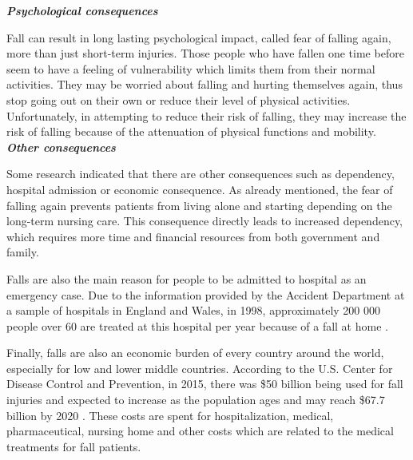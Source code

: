 \documentclass[letterpaper,12pt,titlepage,oneside,final]{book}
\let\origdoublepage\cleardoublepage
\newcommand{\clearemptydoublepage}{%
	\clearpage{\pagestyle{empty}\origdoublepage}}
\let\cleardoublepage\clearemptydoublepage
\begin{document}
\vspace{0.3cm}
\textbf{\textit{Psychological consequences}}\par
Fall can result in long lasting psychological impact, called fear of falling again, more than just short-term injuries. Those people who have fallen one time before seem to have a feeling of vulnerability which limits them from their normal activities. They may be worried about falling and hurting themselves again, thus stop going out on their own or reduce their level of physical activities. Unfortunately, in attempting to reduce their risk of falling,  they may increase the risk of falling because of the attenuation of physical functions and mobility. 	
\cleardoublepage
\vspace{0.3cm}
\textbf{\textit{Other consequences}}\par
Some research indicated that there are other consequences such as dependency, hospital admission or economic consequence. As already mentioned, the fear of falling again prevents patients from living alone and starting depending on the long-term nursing care. This consequence directly leads to increased dependency, which requires more time and financial resources from both government and family. \par
Falls are also the main reason for people to be admitted to hospital as an emergency case. Due to the information provided by the Accident Department at a sample of hospitals in England and Wales, in 1998, approximately 200 000 people over 60 are treated at this hospital per year because of a fall at home \cite{other_consequence_1}.\par
Finally, falls are also an economic burden of every country around the world, especially for low and lower middle countries. According to the U.S. Center for Disease Control and Prevention, in 2015, there was \$50 billion being used for fall injuries and expected to increase as the population ages and may reach \$67.7 billion by 2020 \cite{ncoa}. These costs are spent for hospitalization, medical, pharmaceutical, nursing home and other costs which are related to the medical treatments for fall patients.
\end{document}
